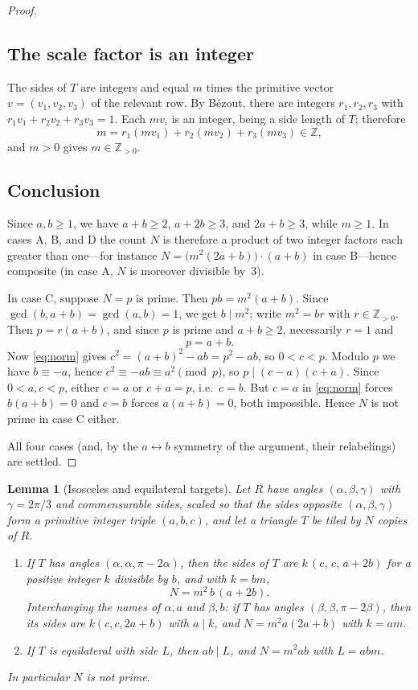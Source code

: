 \documentclass[11pt]{amsart}
\newtheorem{lemma}[theorem]{Lemma}
\theoremstyle{remark}
\newcommand{\Z}{\mathbb{Z}}
\begin{document}
\begin{proof}
\subsection*{The scale factor is an integer}
The sides of $T$ are integers and equal $m$ times the primitive vector $v=(v_1,v_2,v_3)$ of the relevant row. By B\'ezout, there are integers $r_1,r_2,r_3$ with $r_1v_1+r_2v_2+r_3v_3=1$. Each $mv_i$ is an integer, being a side length of $T$; therefore
\[
m=r_1(mv_1)+r_2(mv_2)+r_3(mv_3)\in\Z,
\]
and $m>0$ gives $m\in\Z_{>0}$.

\subsection*{Conclusion}
Since $a,b\ge 1$, we have $a+b\ge 2$, $a+2b\ge 3$, and $2a+b\ge 3$, while $m\ge 1$. In cases A, B, and D the count $N$ is therefore a product of two integer factors each greater than one---for instance $N=\bigl(m^2(2a+b)\bigr)\cdot(a+b)$ in case B---hence composite (in case A, $N$ is moreover divisible by~$3$).

In case C, suppose $N=p$ is prime. Then $pb=m^2(a+b)$. Since $\gcd(b,a+b)=\gcd(a,b)=1$, we get $b\mid m^2$; write $m^2=br$ with $r\in\Z_{>0}$. Then $p=r(a+b)$, and since $p$ is prime and $a+b\ge 2$, necessarily $r=1$ and
\[
p=a+b .
\]
Now \eqref{eq:norm} gives $c^2=(a+b)^2-ab=p^2-ab$, so $0<c<p$. Modulo $p$ we have $b\equiv-a$, hence $c^2\equiv -ab\equiv a^2 \pmod p$, so $p\mid (c-a)(c+a)$. Since $0<a,c<p$, either $c=a$ or $c+a=p$, i.e.\ $c=b$. But $c=a$ in \eqref{eq:norm} forces $b(a+b)=0$ and $c=b$ forces $a(a+b)=0$, both impossible. Hence $N$ is not prime in case C either.

All four cases (and, by the $a\leftrightarrow b$ symmetry of the argument, their relabelings) are settled.
\end{proof}

\begin{lemma}[Isosceles and equilateral targets]\label{lem:rowI}
Let $R$ have angles $(\alpha,\beta,\gamma)$ with $\gamma=2\pi/3$ and commensurable sides, scaled so that the sides opposite $(\alpha,\beta,\gamma)$ form a primitive integer triple $(a,b,c)$, and let a triangle $T$ be tiled by $N$ copies of $R$.
\begin{enumerate}
\item[(a)] If $T$ has angles $(\alpha,\alpha,\pi-2\alpha)$, then the sides of $T$ are $k\,(c,\,c,\,a+2b)$ for a positive integer $k$ divisible by $b$, and with $k=bm$,
\[
N=m^2\,b\,(a+2b).
\]
Interchanging the names of $\alpha,a$ and $\beta,b$: if $T$ has angles $(\beta,\beta,\pi-2\beta)$, then its sides are $k(c,c,2a+b)$ with $a\mid k$, and $N=m^2a(2a+b)$ with $k=am$.
\item[(b)] If $T$ is equilateral with side $L$, then $ab\mid L$, and $N=m^2ab$ with $L=abm$.
\end{enumerate}
In particular $N$ is not prime.
\end{lemma}
\end{document}
